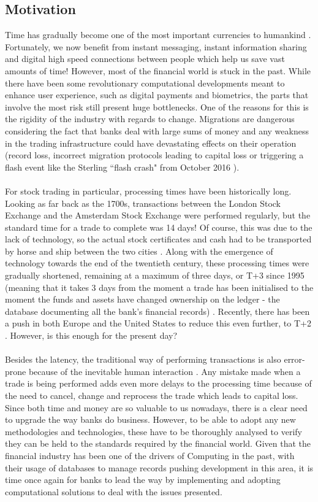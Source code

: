 \documentclass[12pt,twoside]{article}
\begin{document}
\subsection{Motivation}
\label{sub:Motivation}
Time has gradually become one of the most important currencies to humankind \cite{mike}. Fortunately, we now benefit from instant messaging, instant information sharing and digital high speed connections between people which help us save vast amounts of time! However, most of the financial world is stuck in the past. While there have been some revolutionary computational developments meant to enhance user experience, such as digital payments and biometrics\cite{digitalfinance}, the parts that involve the most risk still present huge bottlenecks. One of the reasons for this is the rigidity of the industry with regards to change. Migrations are dangerous considering the fact that banks deal with large sums of money and any weakness in the trading infrastructure could have devastating effects on their operation (record loss, incorrect migration protocols leading to capital loss \cite{bankrisk} or triggering a flash event like the Sterling ``flash crash" from October 2016 \cite{flashcrash}).
\\ \\
For stock trading in particular, processing times have been historically long. Looking as far back as the 1700s, transactions between the London Stock Exchange and the Amsterdam Stock Exchange were performed regularly, but the standard time for a trade to complete was 14 days! Of course, this was due to the lack of technology, so the actual stock certificates and cash had to be transported by horse and ship between the two cities \cite{CHsuperold}. Along with the emergence of technology towards the end of the twentieth century, these processing times were gradually shortened, remaining at a maximum of three days, or T+3 since 1995 (meaning that it takes 3 days from the moment a trade has been initialised to the moment the funds and assets have changed ownership on the ledger - the database documenting all the bank's financial records) \cite{TTimes}. Recently, there has been a push in both Europe and the United States to reduce this even further, to T+2 \cite{newTimes} \cite{newTimesUS}. However, is this enough for the present day?
\\ \\
Besides the latency, the traditional way of performing transactions is also error-prone because of the inevitable human interaction \cite{humanrisk}. Any mistake made when a trade is being performed adds even more delays to the processing time because of the need to cancel, change and reprocess the trade which leads to capital loss. Since both time and money are so valuable to us nowadays, there is a clear need to upgrade the way banks do business. However, to be able to adopt any new methodologies and technologies, these have to be thoroughly analysed to verify they can be held to the standards required by the financial world. Given that the financial industry has been one of the drivers of Computing in the past, with their usage of databases to manage records pushing development in this area, it is time once again for banks to lead the way by implementing and adopting computational solutions to deal with the issues presented.
\end{document}
